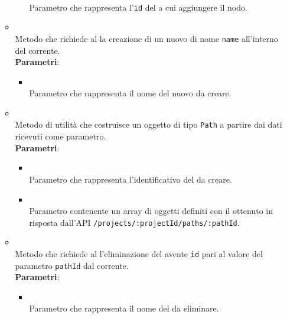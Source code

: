 \begin{itemize}
\begin{itemize}
\begin{itemize}
\\ Parametro che rappresenta l'\texttt{id} del  a cui aggiungere il nodo.
\end{itemize}
\item {}
\\ Metodo che richiede al  la creazione di un nuovo  di nome \texttt{name} all'interno del  corrente.
\\ \textbf{Parametri}:
\begin{itemize}
\item {}
\\ Parametro che rappresenta il nome del nuovo  da creare.
\end{itemize}
\item {}
\\ Metodo di utilità che costruisce un oggetto di tipo \texttt{Path} a partire dai dati ricevuti come parametro.
\\ \textbf{Parametri}:
\begin{itemize}
\item {}
\\ Parametro che rappresenta l'identificativo del  da creare.
\item {}
\\ Parametro contenente un array di oggetti definiti con il  ottenuto in risposta dall'API \texttt{/projects/:projectId/paths/:pathId}.
\end{itemize}
\item {}
\\ Metodo che richiede al  l'eliminazione del  avente \texttt{id} pari al valore del parametro \texttt{pathId} dal  corrente.
\dpReturnPromiseNoValue
\\ \textbf{Parametri}:
\begin{itemize}
\item {}
\\ Parametro che rappresenta il nome del  da eliminare.
\end{itemize}

\end{itemize}
\end{itemize}
